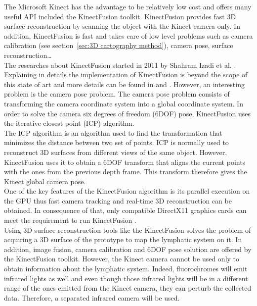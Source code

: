 The Microsoft Kinect has the advantage to be relatively low cost and offers many useful API included the KinectFusion toolkit. KinectFusion provides fast 3D surface reconstruction by scanning the object with the Kinect camera only. In addition, KinectFusion is fast and takes care of low level problems such as camera calibration (see section~\ref{sec:3D cartography method}), camera pose, surface reconstruction\ldots \\

The researches about KinectFusion started in 2011 by Shahram Izadi et al. \cite{izadi_kinectfusion:_2011}. Explaining in details the implementation of KinectFusion is beyond the scope of this state of art and more details can be found in \cite{newcombe_kinectfusion:_2011} and \cite{izadi_kinectfusion:_2011}. However, an interesting problem is the camera pose problem. The camera pose problem consists of transforming the camera coordinate system into a global coordinate system. In order to solve the camera six degrees of freedom (6DOF) pose, KinectFusion uses the iterative closest point (ICP) algorithm.\\

The ICP algorithm is an algorithm used to find the transformation that minimizes the distance between two set of points. ICP is normally used to reconstruct 3D surfaces from different views of the same object. However, KinectFusion uses it to obtain a 6DOF transform that aligns the current points with the ones from the previous depth frame. This transform therefore gives the Kinect global camera pose.\\

One of the key features of the KinectFusion algorithm is its parallel execution \cite{izadi_kinectfusion:_2011} on the GPU thus fast camera tracking and real-time 3D reconstruction can be obtained. In consequence of that, only compatible DirectX11 graphics cards can meet the requirement to run KinectFusion \cite{_kinect_????}.\\

Using 3D surface reconstruction tools like the KinectFusion solves the problem of acquiring a 3D surface of the prototype to map the lymphatic system on it.  In addition, image fusion, camera calibration and 6DOF pose solution are offered by the KinectFusion toolkit. However, the Kinect camera cannot be used only to obtain information about the lymphatic system. Indeed, fluorochromes will emit infrared lights as well and even though those infrared lights will be in a different range of the ones emitted from the Kinect camera, they can perturb the collected data. Therefore, a separated infrared camera will be used.

